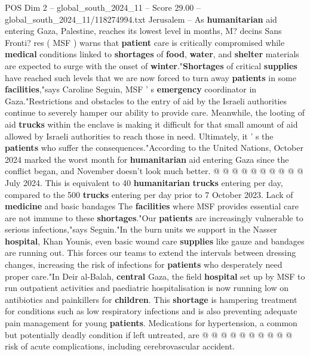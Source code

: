 \begin{textsample}{POS Dim 2 – global\_south\_2024\_11 – Score 29.00 – global\_south\_2024\_11/118274994.txt}  \label{ex:f2_pos_242}
Jerusalem -- As \textbf{humanitarian} aid entering Gaza, Palestine, reaches its lowest level in months, M? decins Sans Fronti? res ( MSF ) warns that \textbf{patient} care is critically compromised while \textbf{medical} conditions linked to \textbf{shortages} of \textbf{food}, \textbf{water}, and \textbf{shelter} materials are expected to surge with the onset of \textbf{winter}."\textbf{Shortages} of critical \textbf{supplies} have reached such levels that we are now forced to turn away \textbf{patients} in some \textbf{facilities},"says Caroline Seguin, MSF ' s \textbf{emergency} coordinator in Gaza."Restrictions and obstacles to the entry of aid by the Israeli authorities continue to severely hamper our ability to provide care.
Meanwhile, the looting of aid \textbf{trucks} within the enclave is making it difficult for that small amount of aid allowed by Israeli authorities to reach those in need.
Ultimately, it ' s the \textbf{patients} who suffer the consequences."According to the United Nations, October 2024 marked the worst month for \textbf{humanitarian} aid entering Gaza since the conflict began, and November doesn't look much better. @ @ @ @ @ @ @ @ @ @ July 2024.
This is equivalent to 40 \textbf{humanitarian} \textbf{trucks} entering per day, compared to the 500 \textbf{trucks} entering per day prior to 7 October 2023.
Lack of \textbf{medicine} and basic bandages The \textbf{facilities} where MSF provides essential care are not immune to these \textbf{shortages}."Our \textbf{patients} are increasingly vulnerable to serious infections,"says Seguin."In the burn units we support in the Nasser \textbf{hospital}, Khan Younis, even basic wound care \textbf{supplies} like gauze and bandages are running out.
This forces our teams to extend the intervals between dressing changes, increasing the risk of infections for \textbf{patients} who desperately need proper care."In Deir al-Balah, \textbf{central} Gaza, the field \textbf{hospital} set up by MSF to run outpatient activities and paediatric hospitalisation is now running low on antibiotics and painkillers for \textbf{children}.
This \textbf{shortage} is hampering treatment for conditions such as low respiratory infections and is also preventing adequate pain management for young \textbf{patients}.
Medications for hypertension, a common but potentially deadly condition if left untreated, are @ @ @ @ @ @ @ @ @ @ risk of acute complications, including cerebrovascular accident.

\end{textsample}
